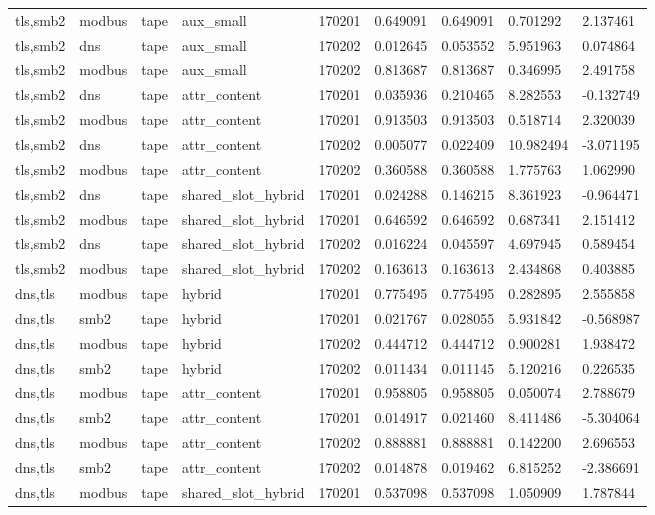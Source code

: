 \begin{tabular}{lllllllll}
tls,smb2 & modbus & tape & aux\_small & 170201 & 0.649091 & 0.649091 & 0.701292 & 2.137461 \\
tls,smb2 & dns & tape & aux\_small & 170202 & 0.012645 & 0.053552 & 5.951963 & 0.074864 \\
tls,smb2 & modbus & tape & aux\_small & 170202 & 0.813687 & 0.813687 & 0.346995 & 2.491758 \\
tls,smb2 & dns & tape & attr\_content & 170201 & 0.035936 & 0.210465 & 8.282553 & -0.132749 \\
tls,smb2 & modbus & tape & attr\_content & 170201 & 0.913503 & 0.913503 & 0.518714 & 2.320039 \\
tls,smb2 & dns & tape & attr\_content & 170202 & 0.005077 & 0.022409 & 10.982494 & -3.071195 \\
tls,smb2 & modbus & tape & attr\_content & 170202 & 0.360588 & 0.360588 & 1.775763 & 1.062990 \\
tls,smb2 & dns & tape & shared\_slot\_hybrid & 170201 & 0.024288 & 0.146215 & 8.361923 & -0.964471 \\
tls,smb2 & modbus & tape & shared\_slot\_hybrid & 170201 & 0.646592 & 0.646592 & 0.687341 & 2.151412 \\
tls,smb2 & dns & tape & shared\_slot\_hybrid & 170202 & 0.016224 & 0.045597 & 4.697945 & 0.589454 \\
tls,smb2 & modbus & tape & shared\_slot\_hybrid & 170202 & 0.163613 & 0.163613 & 2.434868 & 0.403885 \\
dns,tls & modbus & tape & hybrid & 170201 & 0.775495 & 0.775495 & 0.282895 & 2.555858 \\
dns,tls & smb2 & tape & hybrid & 170201 & 0.021767 & 0.028055 & 5.931842 & -0.568987 \\
dns,tls & modbus & tape & hybrid & 170202 & 0.444712 & 0.444712 & 0.900281 & 1.938472 \\
dns,tls & smb2 & tape & hybrid & 170202 & 0.011434 & 0.011145 & 5.120216 & 0.226535 \\
dns,tls & modbus & tape & attr\_content & 170201 & 0.958805 & 0.958805 & 0.050074 & 2.788679 \\
dns,tls & smb2 & tape & attr\_content & 170201 & 0.014917 & 0.021460 & 8.411486 & -5.304064 \\
dns,tls & modbus & tape & attr\_content & 170202 & 0.888881 & 0.888881 & 0.142200 & 2.696553 \\
dns,tls & smb2 & tape & attr\_content & 170202 & 0.014878 & 0.019462 & 6.815252 & -2.386691 \\
dns,tls & modbus & tape & shared\_slot\_hybrid & 170201 & 0.537098 & 0.537098 & 1.050909 & 1.787844 \\

\end{tabular}
